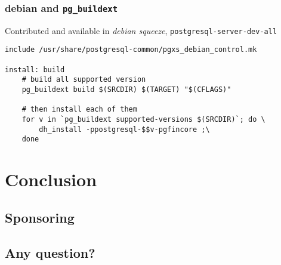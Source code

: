\documentclass[english]{beamer}
\begin{document}
\begin{frame}[fragile]
  \frametitle{debian and \texttt{pg\_buildext}}

  Contributed and available in \textit{debian squeeze},
  \texttt{postgresql-server-dev-all}
  \linebreak

  \begin{example}
\begin{verbatim}
include /usr/share/postgresql-common/pgxs_debian_control.mk

install: build
	# build all supported version
	pg_buildext build $(SRCDIR) $(TARGET) "$(CFLAGS)"

	# then install each of them
	for v in `pg_buildext supported-versions $(SRCDIR)`; do \
		dh_install -ppostgresql-$$v-pgfincore ;\
	done
\end{verbatim}
  \end{example}
\end{frame}

\section{Conclusion}

\subsection{Sponsoring}


\subsection{Any question?}

\end{document}
